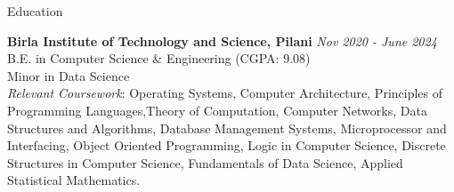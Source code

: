 
\begin{rSection}{Education}
    
    \textbf{Birla Institute of Technology and Science, Pilani} \hfill \textit{Nov 2020 - June 2024} \\
    B.E. in Computer Science \& Engineering (CGPA: 9.08)\\
    Minor in Data Science \smallskip \\
    \textit{Relevant Coursework}: Operating Systems, Computer Architecture, Principles of Programming Languages,Theory of Computation, Computer Networks, Data Structures and Algorithms, Database Management Systems, Microprocessor and Interfacing, Object Oriented Programming, Logic in Computer Science, Discrete Structures in  Computer Science, Fundamentals of Data Science, Applied Statistical Mathematics.
    
\end{rSection}